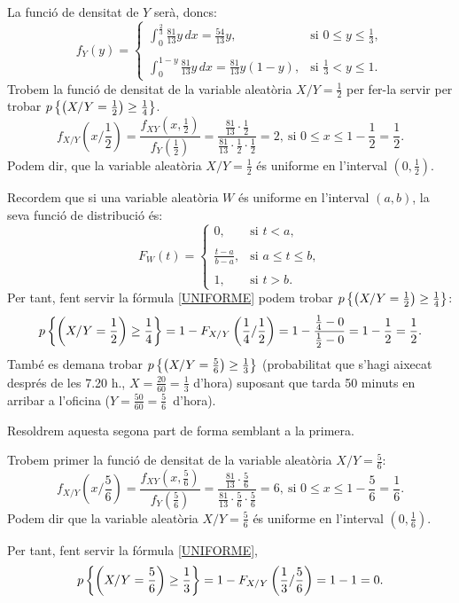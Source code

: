 {La funci\'o de densitat de $Y$ ser\`a, doncs:
\[
f_Y (y) =
\left\{\begin{array}{ll}
\int_0^{\frac{2}{3}} \frac{81}{13} y\, dx =\frac{54}{13} 
y, & \text{si $0\leq y\leq\frac{1}{3}$},\\ & \\
\int_0^{1-y} \frac{81}{13} y\, dx 
=\frac{81}{13} y (1-y), & \text{si $\frac{1}{3}<y\leq 1$.}
\end{array}\right.
\]
Trobem la funci\'o de densitat de la variable aleat\`oria 
$X/Y=\frac{1}{2}$ per fer-la servir per trobar 
\mbox{$p\left\{\left(X/Y=\frac{1}{2}\right)\geq \frac{1}{4}\right\}$.}
\[
f_{X/Y}\left(x/\frac{1}{2}\right)=\frac{f_{XY}\left(x,\frac{1}{2}\right)}
{f_Y\left(\frac{1}{2}\right)}=\frac{\frac{81}{13}\cdot\frac{1}{2}}{\frac{81}{13}
\cdot\frac{1}{2}\cdot
\frac{1}{2}}=2,\ \mbox{si } 0\leq x\leq 1-\frac{1}{2}=\frac{1}{2}.
\]
Podem dir, que la variable aleat\`oria $X/Y=\frac{1}{2}$ \'es  
uniforme en l'interval \mbox{$\left(0,\frac{1}{2}\right)$.} 


Recordem que si una variable aleat\`oria $W$ \'es uniforme en l'interval
$(a,b)$, la seva funci\'o de distribuci\'o \'es:
\begin{equation}
F_W (t)=
\left\{\begin{array}{ll}
0, & \text{si $t<a$},\\ & \\
\frac{t-a}{b-a}, & \text{si $a\leq t\leq 
b$},\\ & \\  1, & \text{si $t>b$.}
\end{array}\right.
\label{UNIFORME}
\end{equation}
Per tant, fent servir la f\'ormula \ref{UNIFORME} podem trobar
\mbox{$p\left\{\left(X/Y=\frac{1}{2}\right)\geq \frac{1}{4}\right\}$:}
\[
p\left\{\left(X/Y=\frac{1}{2}\right)\geq \frac{1}{4}\right\}=
1-F_{X/Y}\left(\frac{1}{4}/\frac{1}{2}\right)=
1-\frac{\frac{1}{4}-0}{\frac{1}{2}-0}=
1-\frac{1}{2}=\frac{1}{2}.
\]
Tamb\'e es demana trobar $p\left\{\left(X/Y=\frac{5}{6}\right)\geq 
\frac{1}{3}\right\}$ (probabilitat que s'hagi aixecat despr\'es de les 
7.20 h., \mbox{$X=\frac{20}{60}=\frac{1}{3}$} d'hora) suposant que 
tarda 50 minuts en arribar a l'oficina 
\mbox{($Y=\frac{50}{60}=\frac{5}{6}$ d'hora).}

Resoldrem aquesta segona part de forma semblant a la primera. 

Trobem primer la funci\'o de densitat de la variable aleat\`oria 
$X/Y=\frac{5}{6}$:
\[
f_{X/Y}\left(x/\frac{5}{6}\right)=
\frac{f_{XY}\left(x,\frac{5}{6}\right)}{f_Y
\left(\frac{5}{6}\right)}=\frac{\frac{81}{13}\cdot\frac{5}{6}}{\frac{81}{13}
\cdot\frac{5}{6}\cdot
\frac{5}{6}}=6,\ \mbox{si } 0\leq x\leq 1-\frac{5}{6}=\frac{1}{6}.
\]
Podem dir que la variable aleat\`oria $X/Y=\frac{5}{6}$ \'es
uniforme en l'interval \mbox{$\left(0,\frac{1}{6}\right)$.} 

Per tant, fent servir la f\'ormula \ref{UNIFORME},
\[
p\left\{\left(X/Y=\frac{5}{6}\right)\geq 
\frac{1}{3}\right\}=1-F_{X/Y}\left(\frac{1}{3}/\frac{5}{6}\right)=
1-1=0.
\]}

